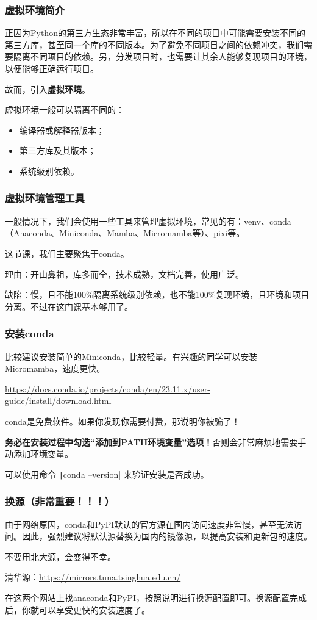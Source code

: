 \begin{frame}
    \frametitle{虚拟环境简介}

    正因为Python的第三方生态非常丰富，所以在不同的项目中可能需要安装不同的第三方库，甚至同一个库的不同版本。为了避免不同项目之间的依赖冲突，我们需要隔离不同项目的依赖。另，分发项目时，也需要让其余人能够复现项目的环境，以便能够正确运行项目。

    故而，引入\textbf{虚拟环境}。

    虚拟环境一般可以隔离不同的：
    \begin{itemize}
        \item 编译器或解释器版本；
        \item 第三方库及其版本；
        \item 系统级别依赖。
    \end{itemize}

\end{frame}

\begin{frame}
    \frametitle{虚拟环境管理工具}

    一般情况下，我们会使用一些工具来管理虚拟环境，常见的有：venv、conda（Anaconda、Miniconda、Mamba、Micromamba等）、pixi等。

    这节课，我们主要聚焦于conda。

    理由：开山鼻祖，库多而全，技术成熟，文档完善，使用广泛。

    缺陷：慢，且不能100\%隔离系统级别依赖，也不能100\%复现环境，且环境和项目分离。不过在这门课基本够用了。

\end{frame}

\begin{frame}
    \frametitle{安装conda}

    比较建议安装简单的Miniconda，比较轻量。有兴趣的同学可以安装Micromamba，速度更快。

    \url{https://docs.conda.io/projects/conda/en/23.11.x/user-guide/install/download.html}

    \alert{conda是免费软件。如果你发现你需要付费，那说明你被骗了！}

    \textbf{务必在安装过程中勾选“添加到PATH环境变量”选项！}否则会非常麻烦地需要手动添加环境变量。

    可以使用命令 \texttt|conda --version| 来验证安装是否成功。

\end{frame}

\begin{frame}
    \frametitle{换源（非常重要！！！）}

    由于网络原因，conda和PyPI默认的官方源在国内访问速度非常慢，甚至无法访问。因此，强烈建议将默认源替换为国内的镜像源，以提高安装和更新包的速度。

    不要用北大源，会变得不幸。

    清华源：\url{https://mirrors.tuna.tsinghua.edu.cn/}

    在这两个网站上找anaconda和PyPI，按照说明进行换源配置即可。换源配置完成后，你就可以享受更快的安装速度了。

\end{frame}

